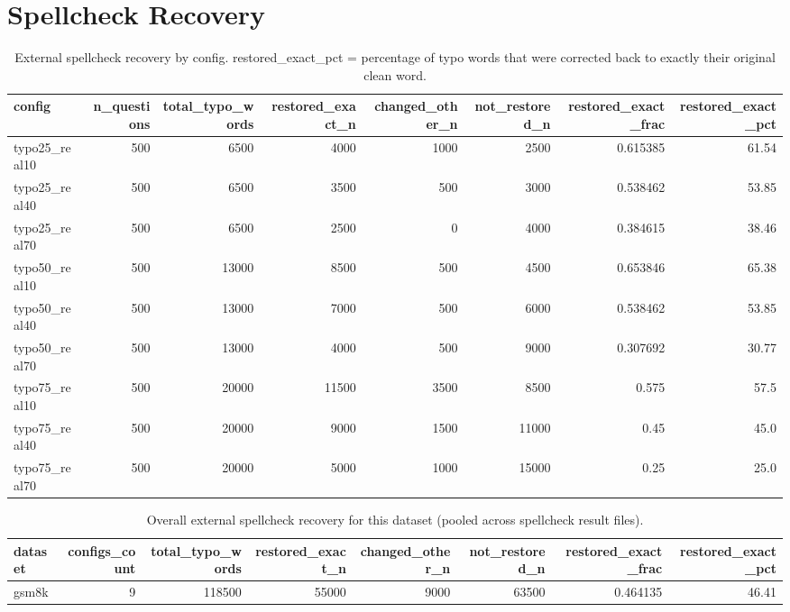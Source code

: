 \documentclass[11pt]{article}
\begin{document}
\section*{Spellcheck Recovery}
\begin{table}[H]
\centering
\caption{External spellcheck recovery by config. restored\_exact\_pct = percentage of typo words that were corrected back to exactly their original clean word.}
\small
\begin{adjustbox}{max width=\textwidth}
\begin{tabular}{lrrrrrrr}
\toprule
\textbf{config} & \textbf{n\_questions} & \textbf{total\_typo\_words} & \textbf{restored\_exact\_n} & \textbf{changed\_other\_n} & \textbf{not\_restored\_n} & \textbf{restored\_exact\_frac} & \textbf{restored\_exact\_pct} \\
\midrule
typo25\_real10 & 500 & 6500 & 4000 & 1000 & 2500 & 0.615385 & 61.54 \\
typo25\_real40 & 500 & 6500 & 3500 & 500 & 3000 & 0.538462 & 53.85 \\
typo25\_real70 & 500 & 6500 & 2500 & 0 & 4000 & 0.384615 & 38.46 \\
typo50\_real10 & 500 & 13000 & 8500 & 500 & 4500 & 0.653846 & 65.38 \\
typo50\_real40 & 500 & 13000 & 7000 & 500 & 6000 & 0.538462 & 53.85 \\
typo50\_real70 & 500 & 13000 & 4000 & 500 & 9000 & 0.307692 & 30.77 \\
typo75\_real10 & 500 & 20000 & 11500 & 3500 & 8500 & 0.575 & 57.5 \\
typo75\_real40 & 500 & 20000 & 9000 & 1500 & 11000 & 0.45 & 45.0 \\
typo75\_real70 & 500 & 20000 & 5000 & 1000 & 15000 & 0.25 & 25.0 \\
\bottomrule
\end{tabular}
\end{adjustbox}
\end{table}

\begin{table}[H]
\centering
\caption{Overall external spellcheck recovery for this dataset (pooled across spellcheck result files).}
\small
\begin{adjustbox}{max width=\textwidth}
\begin{tabular}{lrrrrrrr}
\toprule
\textbf{dataset} & \textbf{configs\_count} & \textbf{total\_typo\_words} & \textbf{restored\_exact\_n} & \textbf{changed\_other\_n} & \textbf{not\_restored\_n} & \textbf{restored\_exact\_frac} & \textbf{restored\_exact\_pct} \\
\midrule
gsm8k & 9 & 118500 & 55000 & 9000 & 63500 & 0.464135 & 46.41 \\
\bottomrule
\end{tabular}
\end{adjustbox}
\end{table}
\end{document}
